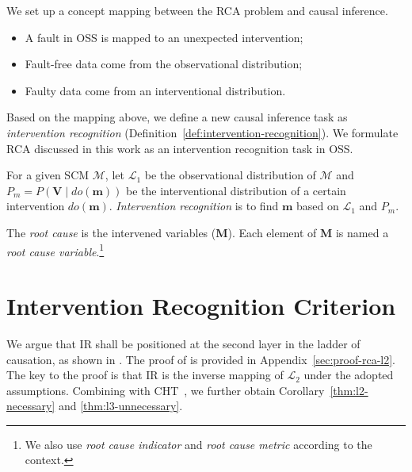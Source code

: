 We set up a concept mapping between the RCA problem and causal inference.
\begin{itemize}
    \item A fault in OSS is mapped to an unexpected intervention;
    \item Fault-free data come from the observational distribution;
    \item Faulty data come from an interventional distribution.
\end{itemize}
Based on the mapping above, we define a new causal inference task as \textit{intervention recognition} (Definition~\ref{def:intervention-recognition}).
We formulate RCA discussed in this work as an intervention recognition task in OSS.

\begin{definition}\label{def:intervention-recognition}
    For a given SCM $\mathcal{M}$, let $\mathcal{L}_{1}$ be the observational distribution of $\mathcal{M}$ and $P_{m} = P(\mathbf{V} \mid do(\mathbf{m}))$ be the interventional distribution of a certain intervention $do(\mathbf{m})$.
    \textit{Intervention recognition} is to find $\mathbf{m}$ based on $\mathcal{L}_{1}$ and $P_{m}$.
\end{definition}

\begin{definition}\label{def:root-cause}
    The \textit{root cause} is the intervened variables ($\mathbf{M}$).
    Each element of $\mathbf{M}$ is named a \textit{root cause variable}.\footnote{We also use \textit{root cause indicator} and \textit{root cause metric} according to the context.}
\end{definition}

\section{Intervention Recognition Criterion}\label{sec:rc-criterion}

We argue that IR shall be positioned at the second layer in the ladder of causation, as shown in .
The proof of  is provided in Appendix~\ref{sec:proof-rca-l2}.
The key to the proof is that IR is the inverse mapping of $\mathcal{L}_{2}$ under the adopted assumptions.
Combining  with CHT~\cite{Bareinboim:2022}, we further obtain Corollary~\ref{thm:l2-necessary} and \ref{thm:l3-unnecessary}.

